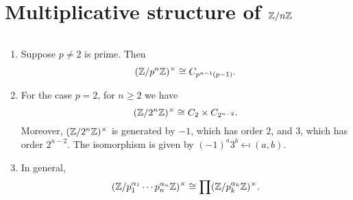 \section{Multiplicative structure of $\mathbb{Z}/n\mathbb{Z}$}
\begin{thm}\label{mult-structure}$\,$
\begin{enumerate}
\item
Suppose $p\ne 2$ is prime. Then
\[
(\mathbb{Z}/p^n\mathbb{Z})^{\times}\cong C_{p^{n-1}(p-1)}.
\]
\item
For the case $p=2$, for $n\ge 2$ we have
\[
(\mathbb{Z}/2^n\mathbb{Z})^{\times}\cong C_2\times C_{2^{n-2}}.
\]
Moreover, $(\mathbb{Z}/2^n\mathbb{Z})^{\times}$ is generated by $-1$, which has order 2, and $3$, which has order $2^{n-2}$. The isomorphism is given by $(-1)^a3^b\mapsfrom (a,b)$.
\item
In general,
\[
(\mathbb{Z}/p_1^{\alpha_1}\cdots p_n^{\alpha_n}\mathbb{Z})^{\times}\cong \prod (\mathbb{Z}/p_k^{\alpha_k}\mathbb{Z})^{\times}.
\]
\end{enumerate}
\end{thm}
